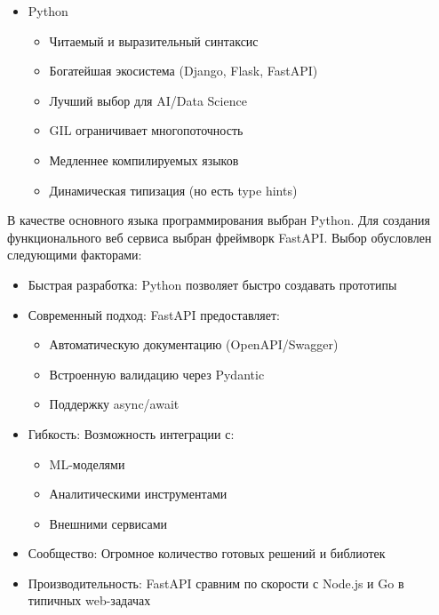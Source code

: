 \documentclass{disser}
\begin{document}
\begin{itemize}
\begin{itemize}
            \item[-] Слабая типизация (TypeScript решает частично)
            \item[-] Проблемы с CPU-интенсивными задачами
        \end{itemize}
    \item Python
        \begin{itemize}
            \item[+] Читаемый и выразительный синтаксис
            \item[+] Богатейшая экосистема (Django, Flask, FastAPI)
            \item[+] Лучший выбор для AI/Data Science
            \item[-] GIL ограничивает многопоточность
            \item[-] Медленнее компилируемых языков
            \item[-] Динамическая типизация (но есть type hints)
        \end{itemize}
\end{itemize}

В качестве основного языка программирования выбран Python. Для создания функционального веб сервиса выбран фреймворк FastAPI.
Выбор обусловлен следующими факторами:
\begin{itemize}
    \item Быстрая разработка: Python позволяет быстро создавать прототипы
    \item Современный подход: FastAPI предоставляет:
    \begin{itemize}
        \item Автоматическую документацию (OpenAPI/Swagger)
        \item Встроенную валидацию через Pydantic
        \item Поддержку async/await
    \end{itemize}
    \item Гибкость: Возможность интеграции с:
    \begin{itemize}
        \item ML-моделями
        \item Аналитическими инструментами
        \item Внешними сервисами
    \end{itemize}
    \item Сообщество: Огромное количество готовых решений и библиотек
    \item Производительность: FastAPI сравним по скорости с Node.js и Go в типичных web-задачах
\end{itemize}
\end{document}
